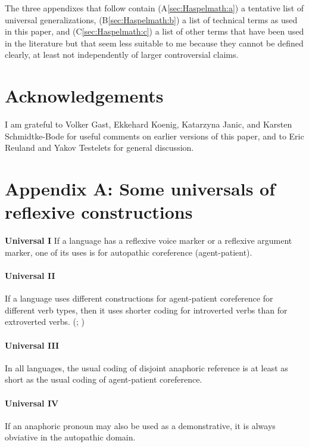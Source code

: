 \documentclass[output=paper]{langscibook}
\begin{document}
The three appendixes that follow contain (A\ref{sec:Haspelmath:a}) a tentative list of universal generalizations, (B\ref{sec:Haspelmath:b}) a list of technical terms as used in this paper, and (C\ref{sec:Haspelmath:c}) a list of other terms that have been used in the literature but that seem less suitable to me because they cannot be defined clearly, at least not independently of larger controversial claims.

\section*{Acknowledgements}

I am grateful to Volker Gast, Ekkehard Koenig, Katarzyna Janic, and Karsten Schmidtke-Bode for useful comments on earlier versions of this paper, and to Eric Reuland and Yakov Testelets for general discussion.



\section*{Appendix A: Some universals of reflexive constructions}\label{sec:Haspelmath:a}

\textbf{Universal I} 
If a language has a reflexive voice marker or a reflexive argument marker, one of its uses is for autopathic coreference (agent-patient).

\paragraph*{Universal II}
If a language uses different constructions for agent-patient coreference for different verb types, then it uses shorter coding for introverted verbs than for extroverted verbs. (\citealt{KoenigVezzosi2004}; \citealt[44]{Haspelmath2008})

\paragraph*{Universal III}
In all languages, the usual coding of disjoint anaphoric reference is at least as short as the usual coding of agent-patient coreference. \citep[48]{Haspelmath2008}

\paragraph*{Universal IV} 

If an anaphoric pronoun may also be used as a demonstrative, it is always obviative in the autopathic domain.
\end{document}

